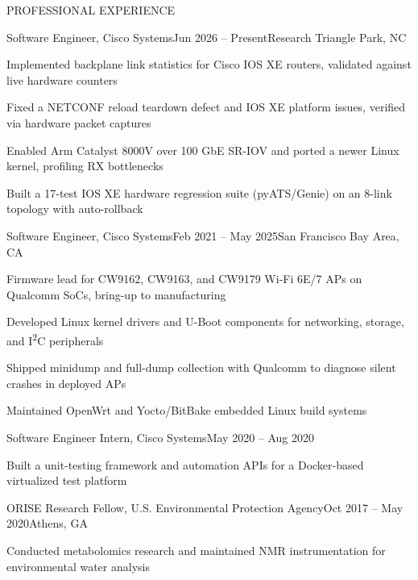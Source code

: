 \documentclass{resume}
\begin{document}
\begin{rSection}{PROFESSIONAL EXPERIENCE}

\begin{rSubsection}{Software Engineer, Cisco Systems}{Jun 2026 -- Present}{Research Triangle Park, NC}{}
\item Implemented backplane link statistics for Cisco IOS XE routers, validated against live hardware counters
\item Fixed a NETCONF reload teardown defect and IOS XE platform issues, verified via hardware packet captures
\item Enabled Arm Catalyst 8000V over 100 GbE SR-IOV and ported a newer Linux kernel, profiling RX bottlenecks
\item Built a 17-test IOS XE hardware regression suite (pyATS/Genie) on an 8-link topology with auto-rollback
\end{rSubsection}

\begin{rSubsection}{Software Engineer, Cisco Systems}{Feb 2021 -- May 2025}{San Francisco Bay Area, CA}{}
\item Firmware lead for CW9162, CW9163, and CW9179 Wi-Fi 6E/7 APs on Qualcomm SoCs, bring-up to manufacturing
\item Developed Linux kernel drivers and U-Boot components for networking, storage, and I\textsuperscript{2}C peripherals
\item Shipped minidump and full-dump collection with Qualcomm to diagnose silent crashes in deployed APs
\item Maintained OpenWrt and Yocto/BitBake embedded Linux build systems
\end{rSubsection}

\begin{rSubsection}{Software Engineer Intern, Cisco Systems}{May 2020 -- Aug 2020}{}{}
\item Built a unit-testing framework and automation APIs for a Docker-based virtualized test platform
\end{rSubsection}

\begin{rSubsection}{ORISE Research Fellow, U.S. Environmental Protection Agency}{Oct 2017 -- May 2020}{Athens, GA}{}
\item Conducted metabolomics research and maintained NMR instrumentation for environmental water analysis
\end{rSubsection}

\end{rSection}
\end{document}
